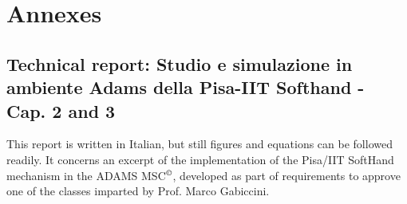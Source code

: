 \documentclass[a4paper,11pt,pdf]{pacmanreport}
\begin{document}


\newpage




\newpage
\appendix
\section{Annexes}









\subsection{Technical report: Studio e simulazione in ambiente Adams della Pisa-IIT Softhand - Cap. 2 and 3 } \label{sec:AdamsSoftHand}
This report is written in Italian, but still figures and equations can be followed readily. It concerns an excerpt of the implementation of the Pisa/IIT SoftHand mechanism in the ADAMS MSC$^\copyright$, developed as part of requirements to approve one of the classes imparted by Prof. Marco Gabiccini.

\end{document}
